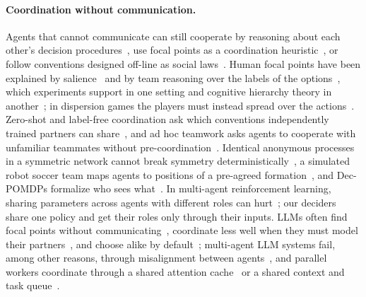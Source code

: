 \paragraph{Coordination without communication.} Agents that cannot communicate can still cooperate by reasoning about each other's decision procedures~\cite{genesereth1986cooperation}, use focal points as a coordination heuristic~\cite{fenster1995coordination,kraus2000focal}, or follow conventions designed off-line as social laws~\cite{shoham1995social}. Human focal points have been explained by salience~\cite{mehta1994salience} and by team reasoning over the labels of the options~\cite{sugden1995theory}, which experiments support in one setting and cognitive hierarchy theory in another~\cite{bardsley2010explaining}; in dispersion games the players must instead spread over the actions~\cite{grenager2002dispersion}. Zero-shot and label-free coordination ask which conventions independently trained partners can share~\cite{hu2020otherplay,treutlein2021new}, and ad hoc teamwork asks agents to cooperate with unfamiliar teammates without pre-coordination~\cite{stone2010adhoc}. Identical anonymous processes in a symmetric network cannot break symmetry deterministically~\cite{angluin1980local}, a simulated robot soccer team maps agents to positions of a pre-agreed formation~\cite{stone1999task}, and Dec-POMDPs formalize who sees what~\cite{bernstein2002complexity}. In multi-agent reinforcement learning, sharing parameters across agents with different roles can hurt~\cite{christianos2021scaling}; our deciders share one policy and get their roles only through their inputs. LLMs often find focal points without communicating~\cite{aharon2026tacit}, coordinate less well when they must model their partners~\cite{agashe2025llmcoordination}, and choose alike by default~\cite{ballestero2026monoculture}; multi-agent LLM systems fail, among other reasons, through misalignment between agents~\cite{cemri2025why}, and parallel workers coordinate through a shared attention cache~\cite{rodionov2025hogwild} or a shared context and task queue~\cite{mao2026delm}.

